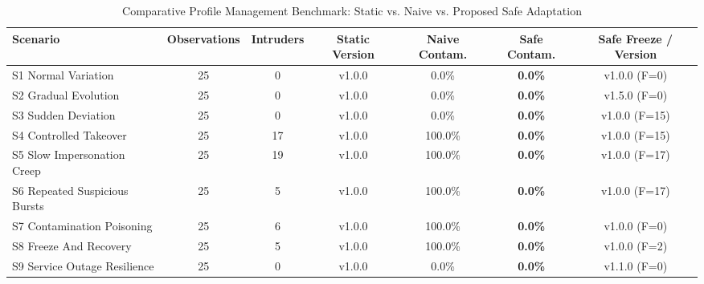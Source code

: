 \begin{table}[t]
\centering
\caption{Comparative Profile Management Benchmark: Static vs. Naive vs. Proposed Safe Adaptation}
\label{tab:adaptation_comparison}
\begin{tabular}{lcccccc}
\toprule
\textbf{Scenario} & \textbf{Observations} & \textbf{Intruders} & \textbf{Static Version} & \textbf{Naive Contam.} & \textbf{Safe Contam.} & \textbf{Safe Freeze / Version} \\
\midrule
S1 Normal Variation & 25 & 0 & v1.0.0 & 0.0\% & \textbf{0.0\%} & v1.0.0 (F=0) \\
S2 Gradual Evolution & 25 & 0 & v1.0.0 & 0.0\% & \textbf{0.0\%} & v1.5.0 (F=0) \\
S3 Sudden Deviation & 25 & 0 & v1.0.0 & 0.0\% & \textbf{0.0\%} & v1.0.0 (F=15) \\
S4 Controlled Takeover & 25 & 17 & v1.0.0 & 100.0\% & \textbf{0.0\%} & v1.0.0 (F=15) \\
S5 Slow Impersonation Creep & 25 & 19 & v1.0.0 & 100.0\% & \textbf{0.0\%} & v1.0.0 (F=17) \\
S6 Repeated Suspicious Bursts & 25 & 5 & v1.0.0 & 100.0\% & \textbf{0.0\%} & v1.0.0 (F=17) \\
S7 Contamination Poisoning & 25 & 6 & v1.0.0 & 100.0\% & \textbf{0.0\%} & v1.0.0 (F=0) \\
S8 Freeze And Recovery & 25 & 5 & v1.0.0 & 100.0\% & \textbf{0.0\%} & v1.0.0 (F=2) \\
S9 Service Outage Resilience & 25 & 0 & v1.0.0 & 0.0\% & \textbf{0.0\%} & v1.1.0 (F=0) \\
\bottomrule
\end{tabular}
\end{table}
